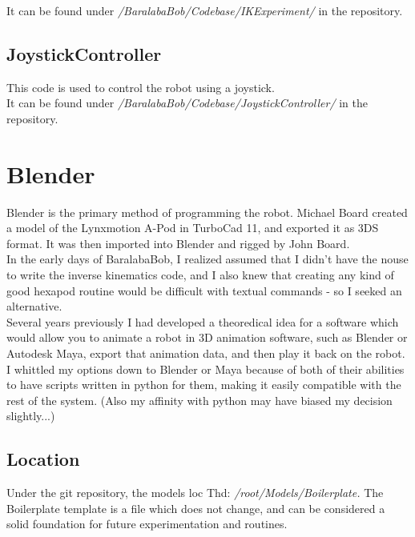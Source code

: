 			It can be found under \textit{/BaralabaBob/Codebase/IKExperiment/} in the repository.\\

			\subsection{JoystickController}
			This code is used to control the robot using a joystick.\\
			
			It can be found under \textit{/BaralabaBob/Codebase/JoystickController/} in the repository.\\
			\pagebreak

		\section{Blender}
			\label{Blender}
			Blender is the primary method of programming the robot. Michael Board created a model of the Lynxmotion A-Pod in TurboCad 11, and exported it as 3DS format. It was then imported into Blender and rigged by John Board.\\
			
			In the early days of BaralabaBob, I realized assumed that I didn't have the nouse to write the inverse kinematics code, and I also knew that creating any kind of good hexapod routine would be difficult with textual commands - so I seeked an alternative.\\
			
			Several years previously I had developed a theoredical idea for a software which would allow you to animate a robot in 3D animation software, such as Blender or Autodesk Maya, export that animation data, and then play it back on the robot.\\
			
			I whittled my options down to Blender or Maya because of both of their abilities to have scripts written in python for them, making it easily compatible with the rest of the system. (Also my affinity with python may have biased my decision slightly...)

			\subsection{Location}
				Under the git repository, the models loc Thd: \emph{/root/Models/Boilerplate.} The Boilerplate template is a file which does not change, and can be considered a solid foundation for future experimentation and routines.
			
